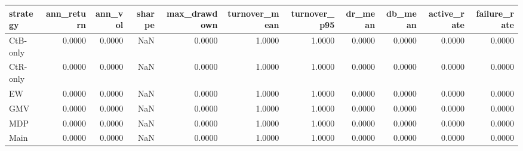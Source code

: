 \begin{tabular}{lrrrrrrrrrr}
\toprule
strategy & ann_return & ann_vol & sharpe & max_drawdown & turnover_mean & turnover_p95 & dr_mean & db_mean & active_rate & failure_rate \\
\midrule
CtB-only & 0.0000 & 0.0000 & NaN & 0.0000 & 1.0000 & 1.0000 & 0.0000 & 0.0000 & 0.0000 & 0.0000 \\
CtR-only & 0.0000 & 0.0000 & NaN & 0.0000 & 1.0000 & 1.0000 & 0.0000 & 0.0000 & 0.0000 & 0.0000 \\
EW & 0.0000 & 0.0000 & NaN & 0.0000 & 1.0000 & 1.0000 & 0.0000 & 0.0000 & 0.0000 & 0.0000 \\
GMV & 0.0000 & 0.0000 & NaN & 0.0000 & 1.0000 & 1.0000 & 0.0000 & 0.0000 & 0.0000 & 0.0000 \\
MDP & 0.0000 & 0.0000 & NaN & 0.0000 & 1.0000 & 1.0000 & 0.0000 & 0.0000 & 0.0000 & 0.0000 \\
Main & 0.0000 & 0.0000 & NaN & 0.0000 & 1.0000 & 1.0000 & 0.0000 & 0.0000 & 0.0000 & 0.0000 \\
\bottomrule
\end{tabular}
